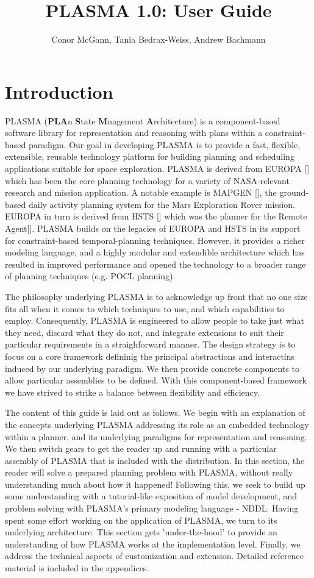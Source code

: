 \documentclass[10pt, letterpaper, twoside]{article}
\author{Conor McGann, Tania Bedrax-Weiss, Andrew Bachmann}
\title{PLASMA 1.0: User Guide}
\begin{document}
\maketitle

\section{Introduction}
PLASMA ({\bf PLA}n {\bf S}tate {\bf M}nagement {\bf A}rchitecture) is a component-based software library for representation and reasoning with plans within a constraint-based paradigm. Our goal in developing PLASMA is to provide a fast, flexible, extensible, reusable technology platform for building planning and scheduling applications suitable for space exploration. PLASMA is derived from EUROPA [] which has been the core planning technology for a variety of NASA-relevant research and mission application. A notable example is  MAPGEN [], the ground-based daily activity planning system for the Mars Exploration Rover mission. EUROPA in turn is derived from HSTS [] which was the planner for the Remote Agent[]. PLASMA builds on the legacies of EUROPA and HSTS in its support for constraint-based temporal-planning techniques. However, it provides a richer modeling language, and a highly modular and extendible architecture which has resulted in improved performance and opened the technology to a broader range of planning techniques (e.g. POCL planning). 

The philosophy underlying PLASMA is to acknowledge up front that no one size fits all when it comes to which techniques to use, and which capabilities to employ. Consequently, PLASMA is engineered to allow people to take just what they need, discard what they do not, and integrate extensions to suit their particular requirements in a straighforward manner. The design strategy is to focus on a core framework defininig the principal abstractions and interactins induced by our underlying paradigm. We then provide concrete components to allow particular assemblies to be defined. With this component-based framework we have strived to strike a balance between flexibility and efficiency.

The content of this guide is laid out as follows. We begin with an explanation of the concepts underlying PLASMA addressing its role as an embedded technology within a planner, and its underlying paradigms for representation and reasoning. We then switch gears to get the reader up and running with a particular assembly of PLASMA that is included with the distribution. In this section, the reader will solve a prepared planning problem with PLASMA, without really understanding much about how it happened! Following this, we seek to build up some understanding with a tutorial-like exposition of model development, and problem solving with PLASMA's primary modeling language - NDDL. Having spent some effort working on the application of PLASMA, we turn to its underlying architecture. This section gets 'under-the-hood' to provide an understanding of how PLASMA works at the implementation level.  Finally, we address the technical aspects of customization and extension. Detailed reference material is included in the appendices.
\end{document}
